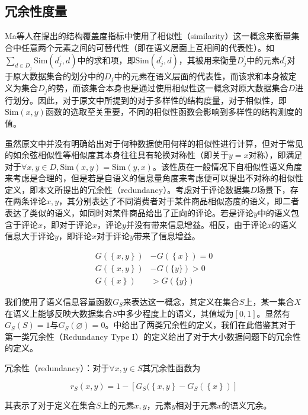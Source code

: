 \documentclass{../notes}
\newcommand{\Sim}{\text{Sim}}
\begin{document}
    \subsection{冗余性度量}

    Ma等人在提出的结构覆盖度指标中使用了相似性（similarity）这一概念来衡量集合中任意两个元素之间的可替代性（即在语义层面上互相间的代表性）。如$\sum_{d\in D_j}{\Sim(d_j^\prime,d)}$中的求和项，即$\Sim(d_j^\prime,d)$，其被用来衡量$D_j^\prime$中的元素$d_j^\prime$对于原大数据集合的划分中的$D_j$中的元素在语义层面的代表性，而该求和本身被定义为集合$D_j$的势，而该集合本身也是通过使用相似性这一概念对原大数据集合$D$进行划分。因此，对于原文中所提到的对于多样性的结构度量，对于相似性，即$\Sim(x,y)$函数的选取至关重要，不同的相似性函数会影响到多样性的结构测度的值。

    虽然原文中并没有明确给出对于何种数据使用何样的相似性进行计算，但对于常见的如余弦相似性等相似度其本身往往具有轮换对称性（即关于$y=x$对称），即满足对于$\forall x,y\in D, \Sim\left(x,y\right)=\Sim(y,x)$。该性质在一般情况下自相似性语义角度来考虑是合理的，但是若是自语义的信息量角度来考虑便可以提出不对称的相似性定义，即本文所提出的冗余性（redundancy）。考虑对于评论数据集$D$场景下，存在两条评论$x,y$，其分别表达了不同消费者对于某件商品相似态度的语义，即二者表达了类似的语义，如同时对某件商品给出了正向的评论。若是评论$y$中的语义包含于评论$x$，即对于评论$x$，评论$y$并没有带来信息增益。相反，由于评论$x$的语义信息大于评论$y$，即评论$x$对于评论$y$带来了信息增益。

    \begin{align}
        G\left(\left\{x,y\right\}\right)&-G\left(\left\{x\right\}\right)=0 \\
        G\left(\left\{x,y\right\}\right)&-G\left(\{y\}\right)>0 \\
        G\left(\left\{x\right\}\right)&>G(\{y\})
    \end{align}

    我们使用了语义信息容量函数$G_S$来表达这一概念，其定义在集合$S$上，某一集合$X$在语义上能够反映大数据集合$S$中多少程度上的语义，其值域为$[0,1]$。显然有$G_S\left(S\right)=1$与$G_S\left(\varnothing\right)=0$。\cite{holst2021redundancy}中给出了两类冗余性的定义，我们在此借鉴其对于第一类冗余性（Redundancy Type I）的定义给出了对于大小数据问题下的冗余性的定义。

    \begin{definition}
        冗余性（redundancy）：对于$\forall x,y\in S$其冗余性函数为

        \begin{equation}
            r_S\left(x,y\right)=1-[G_S(\left\{x,y\right\}-G_S\left(\left\{x\right\}\right)]
        \end{equation}

        其表示了对于定义在集合$S$上的元素$x,y$，元素$y$相对于元素$x$的语义冗余。
    \end{definition}
\end{document}
